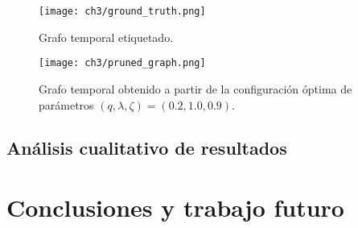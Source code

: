 \documentclass[letterpaper,12pt,oneside]{book} %
\begin{document}

\begin{figure}
    \centering
    \texttt{[image: ch3/ground\_truth.png]}
    \caption{Grafo temporal etiquetado.}
    \label{img:ground_truth}
\end{figure}

\begin{figure}
    \centering
    \texttt{[image: ch3/pruned\_graph.png]}
    \caption{Grafo temporal obtenido a partir de la configuración óptima de parámetros $(q, \lambda, \zeta) = (0.2, 1.0, 0.9)$.}
    \label{img:pruned_graph}
\end{figure}

\section{Análisis cualitativo de resultados}

\chapter{Conclusiones y trabajo futuro}





\end{document}
